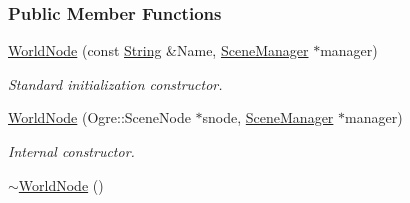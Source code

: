 \subsubsection*{Public Member Functions}
\begin{DoxyCompactItemize}
\item 
\hyperlink{classphys_1_1WorldNode_a02ab92f8a5f9da35926ef133a11a441e}{WorldNode} (const \hyperlink{namespacephys_aa03900411993de7fbfec4789bc1d392e}{String} \&Name, \hyperlink{classphys_1_1SceneManager}{SceneManager} $\ast$manager)
\begin{DoxyCompactList}\small\item\em Standard initialization constructor. \item\end{DoxyCompactList}\item 
\hyperlink{classphys_1_1WorldNode_ae813a2aa737980824725b1909372484e}{WorldNode} (Ogre::SceneNode $\ast$snode, \hyperlink{classphys_1_1SceneManager}{SceneManager} $\ast$manager)
\begin{DoxyCompactList}\small\item\em Internal constructor. \item\end{DoxyCompactList}\item 
\hypertarget{classphys_1_1WorldNode_a357c18b6e04a9ae0d0855841a3c774b2}{
\hyperlink{classphys_1_1WorldNode_a357c18b6e04a9ae0d0855841a3c774b2}{$\sim$WorldNode} ()}
\label{classphys_1_1WorldNode_a357c18b6e04a9ae0d0855841a3c774b2}


\end{DoxyCompactItemize}
